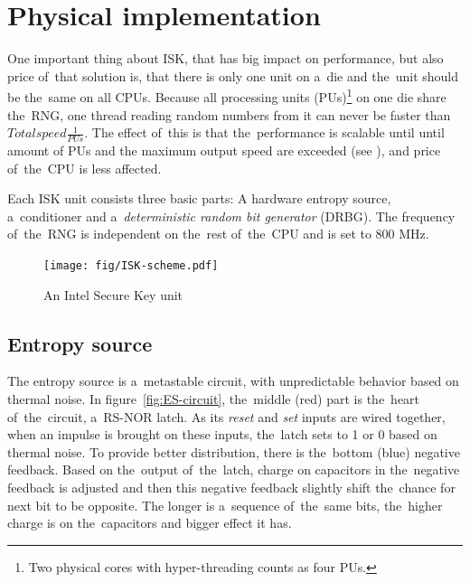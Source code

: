 \section{Physical implementation}\label{sec:ISK-physical}
One important thing about ISK, that has big impact on performance, but also price of~that solution is, that there is only one unit on a~die and the~unit should be the~same on all CPUs. %
Because all processing units (PUs)\footnote{Two physical cores with hyper-threading counts as four PUs.} on one die share the~RNG, one thread reading random numbers from it can never be faster than $Total speed  \frac{1}{PUs}$. The effect of~this is that the~performance is scalable until until amount of PUs and the maximum output speed are exceeded (see ), and price of~the~CPU is less affected.

Each ISK unit consists three basic parts: A hardware entropy source, a~conditioner and a~{\em deterministic random bit generator} (DRBG)\cite{IntelDRNGGuide}. The frequency of~the~RNG is independent on the~rest of~the~CPU and is set to 800 MHz. 
\begin{figure}[h!]
  \centering
 \texttt{[image: fig/ISK-scheme.pdf]} %
\caption{An Intel Secure Key unit}
\label{fig:ISK-unit}
\end{figure}


\subsection{Entropy source}

The entropy source is a~metastable circuit, with unpredictable behavior based 
on thermal noise\cite{UnderstandingRdRandElectronic}. 
In figure~\ref{fig:ES-circuit}, the~middle (red) part is the~heart 
of~the~circuit, a~RS-NOR latch. As its {\em reset} and {\em set} inputs 
are wired together, when an impulse is brought on these inputs, the~latch sets 
to 1 or 0 based on thermal noise. To provide better distribution, there is 
the~bottom (blue) negative feedback. Based on the~output of~the~latch, charge 
on capacitors in the~negative feedback is adjusted and then this negative 
feedback slightly shift the~chance for next bit to be opposite. The longer 
is a~sequence of~the~same bits, the~higher charge is on the~capacitors 
and bigger effect it has.

